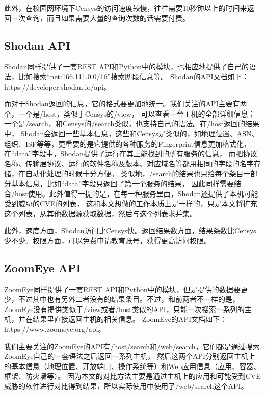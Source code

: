 此外，在校园网环境下Censys的访问速度较慢，往往需要10秒钟以上的时间来返回一次查询，而且如果需要大量的查询次数的话需要付费。

\subsection{Shodan API}
\label{sec:Shodan-API}

Shodan同样提供了一套REST API和Python中的模块，也相应地提供了自己的语法，比如搜索“net:166.111.0.0/16”搜索网段信息等。
Shodan的API文档如下：https://developer.shodan.io/api。

而对于Shodan返回的信息，它的格式要更加地统一。我们关注的API主要有两个，一个是/host，类似于Censys的/view，
可以查看一台主机的全部详细信息；一个是/search，和Censys的/search类似，也支持自己的语法。在/host返回的结果中，
Shodan会返回一些基本信息，这些和Censys是类似的，如地理位置、ASN、组织、ISP等等，更重要的是它提供的各种服务的Fingerprint信息更加格式化，
在“data”字段中，Shodan提供了运行在其上能找到的所有服务的信息，
而把协议名称、传输层协议、运行的软件名称及版本、对应域名等都用相同的字段的名字存储，在自动化处理的时候十分方便。
类似地，/search的结果也只给每个条目一部分基本信息，比如“data”字段只返回了第一个服务的结果，
因此同样需要结合/host使用。此外值得一提的是，在每一种服务里面，Shodan还提供了本机可能受到威胁的CVE的列表，
这和本文想做的工作本质上是一样的，只是本文将扩充这个列表，从其他数据源获取数据，然后与这个列表求并集。

此外，速度方面，Shodan访问比Censys快。返回结果数方面，结果条数比Censys少不少。权限方面，可以免费申请教育账号，获得更高访问权限。

\subsection{ZoomEye API}
\label{sec:ZoomEye-API}

ZoomEye同样提供了一套REST API和Python中的模块，但是提供的数据要更少，不过其中也有另外二者没有的结果条目。不过，和前两者不一样的是，
ZoomEye没有提供类似于/view或者/host类似的API，只能一次搜索一系列的主机，并在结果里直接返回主机的相关信息。
ZoomEye的API文档如下：https://www.zoomeye.org/api。

我们主要关注的ZoomEye的API有/host/search和/web/search，它们都是通过搜索ZoomEye自己的一套语法之后返回一系列主机，
然后这两个API分别返回主机上的基本信息（地理位置、开放端口、操作系统等）和Web应用信息（应用、容器、框架、防火墙等）。
因为本文的对比方法主要是通过主机上的应用和可能受到CVE威胁的软件进行对比得到结果，所以实际使用中使用了/web/search这个API。

